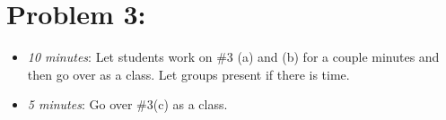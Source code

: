 \documentclass[handout,nooutcomes]{ximera}
\begin{document}
	
	
\section*{Problem 3:}

	\begin{itemize}
	
	\item  \emph{10 minutes}:  Let students work on \#3 (a) and (b) for a couple minutes and then go over as a class.  Let groups present if there is time.
		
	\item  \emph{5 minutes}:  Go over \#3(c) as a class.
	
	\end{itemize}
	


	
	
	

	
	

	
	
	

	
	
	
\end{document}
